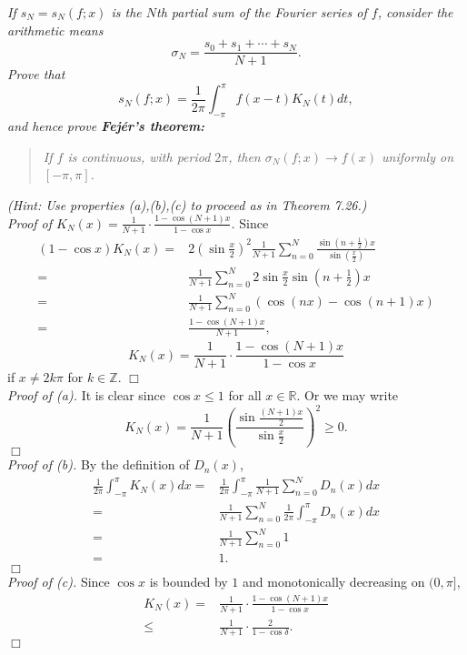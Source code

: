 \documentclass{article}
\begin{document}
\emph{If $s_N = s_N(f;x)$ is the $N$th partial sum of the Fourier series of $f$,
consider the arithmetic means
\[
  \sigma_N = \frac{s_0+s_1+\cdots+s_N}{N+1}.
\]
Prove that
\[
  s_N(f;x) = \frac{1}{2\pi} \int_{-\pi}^{\pi} f(x-t)K_N(t)dt,
\]
and hence prove \textbf{Fej\'er's theorem:}}
\begin{quote}
  \emph{If $f$ is continuous, with period $2\pi$,
  then $\sigma_N(f;x) \to f(x)$ uniformly on $[-\pi,\pi]$.}
\end{quote}
\emph{(Hint: Use properties (a),(b),(c) to proceed as in Theorem 7.26.)} \\



\emph{Proof of $K_N(x) = \frac{1}{N+1} \cdot \frac{1-\cos(N+1)x}{1-\cos x}$.}
Since
  \begin{align*}
    (1-\cos x) K_N(x)
    =& 2 \left( \sin \frac{x}{2} \right)^2 \frac{1}{N+1}
      \sum_{n=0}^{N} \frac{\sin(n+\frac{1}{2})x}{\sin(\frac{x}{2})} \\
    =& \frac{1}{N+1}
      \sum_{n=0}^{N} 2 \sin \frac{x}{2} \sin(n+\frac{1}{2})x \\
    =& \frac{1}{N+1}
      \sum_{n=0}^{N} (\cos(nx) - \cos(n+1)x) \\
    =& \frac{1 - \cos(N+1)x}{N+1},
  \end{align*}
\[
  K_N(x) = \frac{1}{N+1} \cdot \frac{1-\cos(N+1)x}{1-\cos x}
\]
if $x \neq 2k\pi$ for $k \in \mathbb{Z}$.
$\Box$ \\

\emph{Proof of (a).}
It is clear since $\cos x \leq 1$ for all $x \in \mathbb{R}$.
Or we may write
\[
  K_N(x) = \frac{1}{N+1} \left( \frac{\sin \frac{(N+1)x}{2}}{\sin \frac{x}{2}} \right)^2 \geq 0.
\]
$\Box$ \\

\emph{Proof of (b).}
By the definition of $D_n(x)$,
  \begin{align*}
     \frac{1}{2\pi} \int_{-\pi}^{\pi} K_N(x) dx
     =& \frac{1}{2\pi} \int_{-\pi}^{\pi} \frac{1}{N+1} \sum_{n=0}^{N} D_n(x) dx \\
     =& \frac{1}{N+1} \sum_{n=0}^{N} \frac{1}{2\pi} \int_{-\pi}^{\pi} D_n(x) dx \\
     =& \frac{1}{N+1} \sum_{n=0}^{N} 1 \\
     =& 1.
  \end{align*}
$\Box$ \\

\emph{Proof of (c).}
Since $\cos x$ is bounded by $1$ and monotonically decreasing on $(0, \pi]$,
  \begin{align*}
    K_N(x)
    =& \frac{1}{N+1} \cdot \frac{1-\cos(N+1)x}{1-\cos x} \\
    \leq& \frac{1}{N+1} \cdot \frac{2}{1-\cos \delta}.
  \end{align*}
$\Box$ \\
\end{document}
